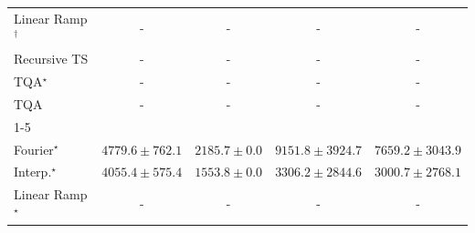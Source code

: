 \begin{tabular}{l|cccc|}
Linear Ramp$^\dagger$ & {\cellcolor[HTML]{000000}} \color[HTML]{F1F1F1} {\cellcolor{white}} \color{black} - & {\cellcolor[HTML]{000000}} \color[HTML]{F1F1F1} {\cellcolor{white}} \color{black} - & {\cellcolor[HTML]{000000}} \color[HTML]{F1F1F1} {\cellcolor{white}} \color{black} - & {\cellcolor[HTML]{000000}} \color[HTML]{F1F1F1} {\cellcolor{white}} \color{black} - \\
Recursive TS & {\cellcolor[HTML]{000000}} \color[HTML]{F1F1F1} {\cellcolor{white}} \color{black} - & {\cellcolor[HTML]{000000}} \color[HTML]{F1F1F1} {\cellcolor{white}} \color{black} - & {\cellcolor[HTML]{000000}} \color[HTML]{F1F1F1} {\cellcolor{white}} \color{black} - & {\cellcolor[HTML]{000000}} \color[HTML]{F1F1F1} {\cellcolor{white}} \color{black} - \\
TQA$^\star$ & {\cellcolor[HTML]{000000}} \color[HTML]{F1F1F1} {\cellcolor{white}} \color{black} - & {\cellcolor[HTML]{000000}} \color[HTML]{F1F1F1} {\cellcolor{white}} \color{black} - & {\cellcolor[HTML]{000000}} \color[HTML]{F1F1F1} {\cellcolor{white}} \color{black} - & {\cellcolor[HTML]{000000}} \color[HTML]{F1F1F1} {\cellcolor{white}} \color{black} - \\
TQA & {\cellcolor[HTML]{000000}} \color[HTML]{F1F1F1} {\cellcolor{white}} \color{black} - & {\cellcolor[HTML]{000000}} \color[HTML]{F1F1F1} {\cellcolor{white}} \color{black} - & {\cellcolor[HTML]{000000}} \color[HTML]{F1F1F1} {\cellcolor{white}} \color{black} - & {\cellcolor[HTML]{000000}} \color[HTML]{F1F1F1} {\cellcolor{white}} \color{black} - \\
\cline{1-5}
\multicolumn{5}{c}{\rule{0pt}{8pt}SV} \\
\midrule
Fourier$^\star$ & {\cellcolor[HTML]{94B6D7}} \color[HTML]{000000} $4779.6\pm 762.1$ & {\cellcolor[HTML]{F2ECF5}} \color[HTML]{000000} $2185.7\pm 0.0$ & {\cellcolor[HTML]{023A5B}} \color[HTML]{F1F1F1} $9151.8\pm 3924.7$ & {\cellcolor[HTML]{0567A2}} \color[HTML]{F1F1F1} $7659.2\pm 3043.9$ \\
Interp.$^\star$ & {\cellcolor[HTML]{B7C5DF}} \color[HTML]{000000} $4055.4\pm 575.4$ & {\cellcolor[HTML]{FFF7FB}} \color[HTML]{000000} $1553.8\pm 0.0$ & {\cellcolor[HTML]{D5D5E8}} \color[HTML]{000000} $3306.2\pm 2844.6$ & {\cellcolor[HTML]{DEDCEC}} \color[HTML]{000000} $3000.7\pm 2768.1$ \\
Linear Ramp$^\star$ & {\cellcolor[HTML]{000000}} \color[HTML]{F1F1F1} {\cellcolor{white}} \color{black} - & {\cellcolor[HTML]{000000}} \color[HTML]{F1F1F1} {\cellcolor{white}} \color{black} - & {\cellcolor[HTML]{000000}} \color[HTML]{F1F1F1} {\cellcolor{white}} \color{black} - & {\cellcolor[HTML]{000000}} \color[HTML]{F1F1F1} {\cellcolor{white}} \color{black} - \\

\end{tabular}
